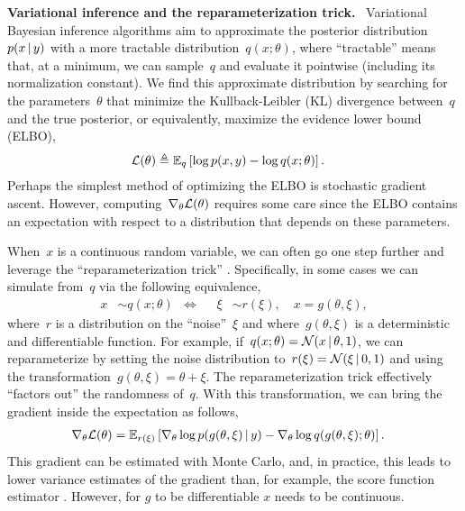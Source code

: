 \documentclass[twoside]{article}
\DeclareRobustCommand{\parhead}[1]{\textbf{#1}~}
\begin{document}
\parhead{Variational inference and the reparameterization trick.}
Variational Bayesian inference algorithms aim to approximate the
posterior distribution~$p(x \, | \, y)$ with a more tractable
distribution~$q(x; \theta)$, where ``tractable'' means that, at a
minimum, we can sample~$q$ and evaluate it pointwise (including
its normalization constant).  We find this approximate distribution
by searching for the parameters~$\theta$ that minimize the Kullback-Leibler (KL)
divergence between~$q$ and the true posterior, or equivalently,
maximize the evidence lower bound (ELBO),
\begin{align}
  \mathcal{L}(\theta) &\triangleq \mathbb{E}_q \left[ \log p(x, y) - \log q(x; \theta) \right].
\end{align}
Perhaps the simplest method of optimizing the ELBO is stochastic
gradient ascent. 
However, computing~$\nabla_\theta \mathcal{L}(\theta)$ requires some care
since the ELBO contains an expectation with respect to a distribution
that depends on these parameters.

When~$x$ is a continuous random variable, we can often go one step
further and leverage the ``reparameterization trick''
\citep{Salimans2013, Kingma2014}.  Specifically, in some cases we can
simulate from~$q$ via the following equivalence,
\begin{align}
  \label{eq:reparam}
  x &\sim q(x; \theta)
      & \iff & &  
  \xi &\sim r(\xi), \quad x = g(\theta, \xi),
\end{align}
where~$r$ is a distribution on the ``noise''~$\xi$ and
where~$g(\theta, \xi)$ is a deterministic and differentiable
function. For example,
if~${q(x; \theta) = \mathcal{N}(x \, | \, \theta, 1)}$, we can
reparameterize by setting the noise distribution
to~${r(\xi) = \mathcal{N}(\xi \, | \, 0, 1)}$ and using the
transformation~${g(\theta, \xi) = \theta + \xi}$.  The
reparameterization trick effectively ``factors out'' the randomness
of~$q$. With this transformation, we can bring the gradient inside the
expectation as follows,
\begin{align}
  \nabla_\theta \mathcal{L}(\theta) 
  &= \mathbb{E}_{r(\xi)} \left[ \nabla_\theta \log p(g(\theta, \xi) \, | \, y)
    - \nabla_\theta  \log q(g(\theta, \xi); \theta) \right].
\end{align}
This gradient can be estimated with Monte Carlo, and, in practice,
this leads to lower variance estimates of the gradient than, for
example, the score function estimator \citep{Williams1992, Glynn1990}.
However, for $g$ to be differentiable $x$ needs to be continuous.
\end{document}
